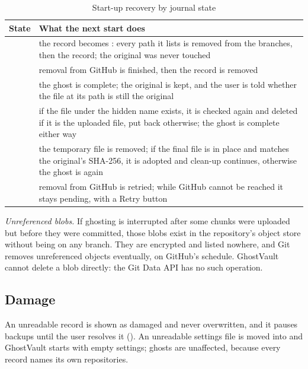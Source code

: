 \begin{table}[t]
\caption{Start-up recovery by journal state}\label{tab:recovery}
\centering\footnotesize
\begin{tabular}{@{}L{24mm}L{58mm}@{}}
\toprule
\textbf{State} & \textbf{What the next start does} \\
\midrule
{} & the record becomes : every path it lists is removed from the
branches, then the record; the original was never touched \\ \addlinespace[1.6pt]
 & removal from GitHub is finished, then the record is removed \\ \addlinespace[1.6pt]
 & the ghost is complete; the original is kept, and the user is told whether the
file at its path is still the original \\ \addlinespace[1.6pt]
 & if the file under the hidden name exists, it is checked again and
deleted if it is the uploaded file, put back otherwise; the ghost is complete either way \\ \addlinespace[1.6pt]
 & the temporary file is removed; if the final file is in place and matches the
original's SHA-256, it is adopted and clean-up continues, otherwise the ghost is 
again \\ \addlinespace[1.6pt]
 & removal from GitHub is retried; while GitHub cannot be reached it stays pending,
with a Retry button \\
\bottomrule
\end{tabular}
\end{table}

\emph{Unreferenced blobs.} If ghosting is interrupted after some chunks were uploaded but before
they were committed, those blobs exist in the repository's object store without being on any
branch. They are encrypted and listed nowhere, and Git removes unreferenced objects eventually, on
GitHub's schedule. GhostVault cannot delete a blob directly: the Git Data API has no such
operation.

\subsection{Damage}
An unreadable record is shown as damaged and never overwritten, and it pauses backups until the
user resolves it (). An unreadable settings file is moved into
 and GhostVault starts with empty settings; ghosts are unaffected, because every
record names its own repositories.
